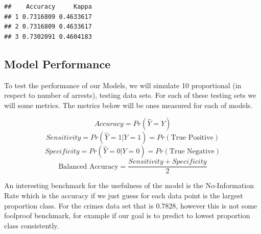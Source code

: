 \documentclass[
]{article}
\begin{document}
\begin{verbatim}
##    Accuracy     Kappa
## 1 0.7316809 0.4633617
## 2 0.7316809 0.4633617
## 3 0.7302091 0.4604183
\end{verbatim}

\subsection{Model Performance}

To test the performance of our Models, we will simulate 10 proportional
(in respect to number of arrests), testing data sets. For each of these
testing sets we will some metrics. The metrics below will be ones
measured for each of models.

\[Accuracy = Pr(\hat{Y} = Y)\]
\[Sensitivity = Pr(\hat{Y} = 1 | Y = 1) = Pr(\text{True Positive})\]
\[Specificity = Pr(\hat{Y} = 0| Y = 0) = Pr(\text{True Negative})\]
\[\text{Balanced Accuracy} = \frac{Sensitivity + Specificity}{2}\]

An interesting benchmark for the usefulness of the model is the
No-Information Rate which is the accuracy if we just guess for each data
point is the largest proportion class. For the crimes data set that is
\(0.7828\), however this is not some foolproof benchmark, for example if
our goal is to predict to lowest proportion class consistently.
\end{document}
